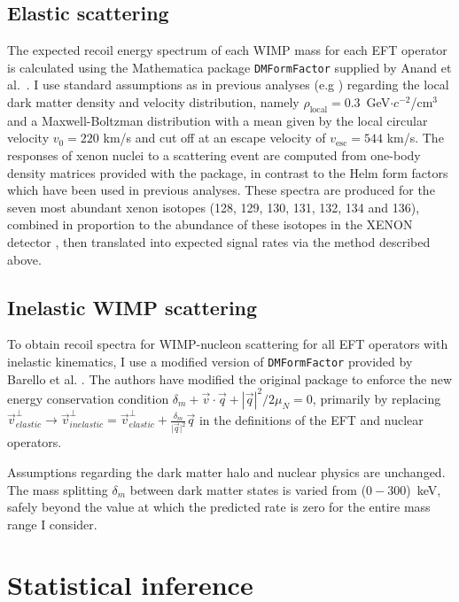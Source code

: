 \subsection{Elastic scattering}
\label{subsubsec:Elastic}

The expected recoil energy spectrum of each WIMP mass for each EFT operator is calculated using the Mathematica package \texttt{DMFormFactor} supplied by Anand et al.~\cite{Fitzpatrick:MathTools,Anand:MathTools}. I use standard assumptions as in previous analyses (e.g \cite{xe100_run_combination}) regarding the local dark matter density and velocity distribution, namely $\rho_\mathrm{local} = 0.3$~GeV$\cdot c^{-2}$/$\mathrm{cm}^{3}$ and a Maxwell-Boltzman distribution with a mean given by the local circular velocity $v_0 = 220$ km/s and cut off at an escape velocity of $v_\mathrm{esc} = 544$ km/s. The responses of xenon nuclei to a scattering event are computed from one-body density matrices provided with the package, in contrast to the Helm form factors which have been used in previous analyses. These spectra are produced for the seven most abundant xenon isotopes (128, 129, 130, 131, 132, 134 and 136), combined in proportion to the abundance of these isotopes in the XENON detector \cite{xe100_run10_sd}, then translated into expected signal rates via the method described above.

\subsection{Inelastic WIMP scattering}
\label{subsubsec:Inelastic}
To obtain recoil spectra for WIMP-nucleon scattering for all EFT operators with inelastic kinematics, I use a modified version of \texttt{DMFormFactor} provided by Barello et al. \cite{InelasticMath}. The authors have modified the original package to enforce the new energy conservation condition $\delta_m + \vec{v}\cdot\vec{q} + \left|\vec{q}\right|^2/2\mu_N = 0$, primarily by replacing 
$\vec{v}^\perp_{elastic} \rightarrow \vec{v}^\perp_{inelastic} = \vec{v}^\perp_{elastic} +\frac{\delta_m}{\vert{\vec{q}}\vert^2}\vec{q}$ in the definitions of the EFT and nuclear operators. 

Assumptions regarding the dark matter halo and nuclear physics are unchanged. The mass splitting $\delta_m$ between dark matter states is varied from ($0-300$)~keV, safely beyond the value at which the predicted rate is zero for the entire mass range I consider.

\section{Statistical inference}
\label{sec:LikelihoodFunction}

